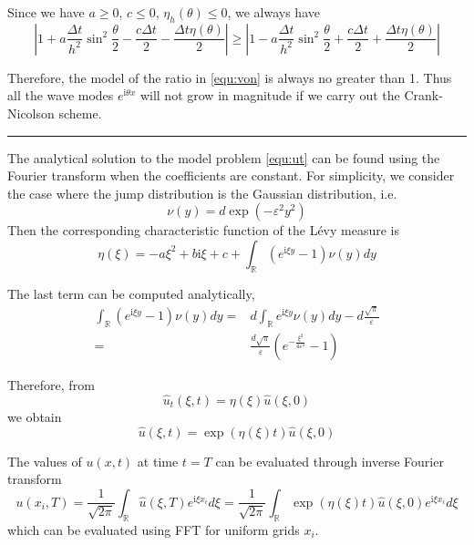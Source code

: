 \documentclass[10pt,a4paper]{article}
\newcommand{\ii}[0]{\mathrm{i}}
\newcommand{\RR}[0]{\mathbb{R}}
\theoremstyle{definition}
\begin{document}
Since we have $a\geq 0$, $c\leq 0$, $\eta_h(\theta)\leq  0$, we always have
\begin{equation}
	\left| {1 + a\frac{{\Delta t}}{{{h^2}}}{{\sin }^2}\frac{\theta }{2} - \frac{{c\Delta t}}{2} - \frac{{\Delta t\eta (\theta )}}{2}} \right| \ge \left| {1 - a\frac{{\Delta t}}{{{h^2}}}{{\sin }^2}\frac{\theta }{2} + \frac{{c\Delta t}}{2} + \frac{{\Delta t\eta (\theta )}}{2}} \right|
\end{equation}

Therefore, the model of the ratio in \cref{equ:von} is always no greater than 1. Thus all the wave modes $e^{\ii \theta x}$ will not grow in magnitude if we carry out the Crank-Nicolson scheme. 

\hrule


The analytical solution to the model problem \cref{equ:ut} can be found using the Fourier transform when the coefficients are constant. For simplicity, we consider the case where the jump distribution is the Gaussian distribution, i.e. 
\begin{equation}
	\nu(y) = d\exp(-\varepsilon^2 y^2)
\end{equation}
Then the corresponding characteristic function of the L\'evy measure is 
\begin{equation}
	\eta(\xi) = -a\xi^2 + b\ii \xi + c + \int_\RR (e^{\ii \xi y}-1)\nu(y)dy
\end{equation}

The last term can be computed analytically,
\begin{align}
	\int_{\RR} {({e^{\ii\xi y}} - 1)} \nu (y)dy =& d\int_{\RR} {{e^{\ii\xi y}}\nu (y)} dy - d\frac{{\sqrt \pi  }}{\varepsilon }\\
	 =&\frac{{ d\sqrt \pi  }}{\varepsilon }\left( {{e^{ - \frac{{{\xi ^2}}}{{4{\varepsilon ^2}}}}} - 1} \right)
\end{align}

Therefore, from 
\begin{equation}
	\hat u_t(\xi, t) = \eta(\xi) \hat u(\xi, 0)
\end{equation}
we obtain
\begin{equation}
	\hat u(\xi, t) = \exp(\eta(\xi)t)\hat u(\xi, 0)
\end{equation}

The values of $u(x,t)$ at time $t=T$ can be evaluated through inverse Fourier transform
\begin{equation}
	u(x_i, T) = \frac{1}{\sqrt{2\pi}}\int_\RR \hat u(\xi, T) e^{\ii \xi x_i} d\xi  = \frac{1}{\sqrt{2\pi}}\int_\RR  \exp(\eta(\xi)t)\hat u(\xi, 0) e^{\ii \xi x_i} d\xi 
\end{equation}
which can be evaluated using FFT for uniform grids $x_i$. 
\end{document}
